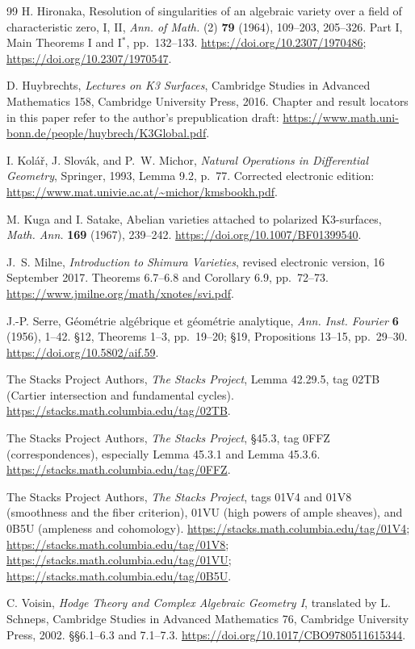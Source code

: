 \begin{thebibliography}{99}
H. Hironaka,
Resolution of singularities of an algebraic variety over a field of
characteristic zero, I, II,
\emph{Ann. of Math.} (2) \textbf{79} (1964), 109--203, 205--326.
Part I, Main Theorems I and I$^*$, pp.~132--133.
\url{https://doi.org/10.2307/1970486};
\url{https://doi.org/10.2307/1970547}.

D. Huybrechts,
\emph{Lectures on K3 Surfaces},
Cambridge Studies in Advanced Mathematics 158,
Cambridge University Press, 2016.
Chapter and result locators in this paper refer to the author's
prepublication draft:
\url{https://www.math.uni-bonn.de/people/huybrech/K3Global.pdf}.

I. Kol\'a\v r, J. Slov\'ak, and P.~W. Michor,
\emph{Natural Operations in Differential Geometry},
Springer, 1993, Lemma 9.2, p.~77.
Corrected electronic edition:
\url{https://www.mat.univie.ac.at/~michor/kmsbookh.pdf}.

M. Kuga and I. Satake,
Abelian varieties attached to polarized K3-surfaces,
\emph{Math. Ann.} \textbf{169} (1967), 239--242.
\url{https://doi.org/10.1007/BF01399540}.

J.~S. Milne,
\emph{Introduction to Shimura Varieties},
revised electronic version, 16 September 2017.
Theorems 6.7--6.8 and Corollary 6.9, pp.~72--73.
\url{https://www.jmilne.org/math/xnotes/svi.pdf}.

J.-P. Serre,
G\'eom\'etrie alg\'ebrique et g\'eom\'etrie analytique,
\emph{Ann. Inst. Fourier} \textbf{6} (1956), 1--42.
\S12, Theorems 1--3, pp.~19--20; \S19, Propositions 13--15,
pp.~29--30.
\url{https://doi.org/10.5802/aif.59}.

The Stacks Project Authors,
\emph{The Stacks Project},
Lemma 42.29.5, tag 02TB (Cartier intersection and fundamental cycles).
\url{https://stacks.math.columbia.edu/tag/02TB}.

The Stacks Project Authors,
\emph{The Stacks Project},
\S45.3, tag 0FFZ (correspondences), especially
Lemma 45.3.1 and Lemma 45.3.6.
\url{https://stacks.math.columbia.edu/tag/0FFZ}.

The Stacks Project Authors,
\emph{The Stacks Project},
tags 01V4 and 01V8 (smoothness and the fiber criterion),
01VU (high powers of ample sheaves),
and 0B5U (ampleness and cohomology).
\url{https://stacks.math.columbia.edu/tag/01V4};
\url{https://stacks.math.columbia.edu/tag/01V8};
\url{https://stacks.math.columbia.edu/tag/01VU};
\url{https://stacks.math.columbia.edu/tag/0B5U}.

C. Voisin,
\emph{Hodge Theory and Complex Algebraic Geometry I},
translated by L. Schneps,
Cambridge Studies in Advanced Mathematics 76,
Cambridge University Press, 2002.
\S\S6.1--6.3 and 7.1--7.3.
\url{https://doi.org/10.1017/CBO9780511615344}.

\end{thebibliography}
